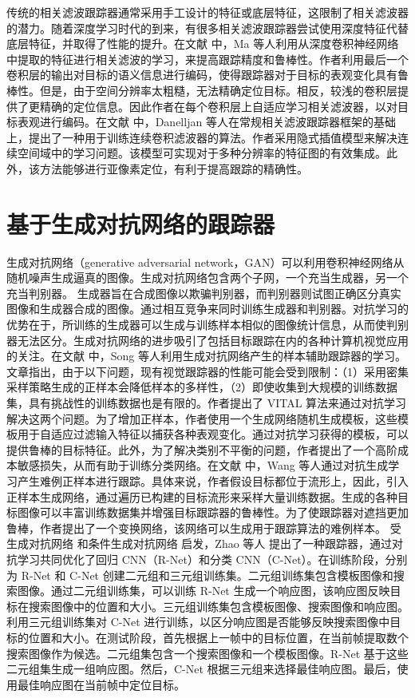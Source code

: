 传统的相关滤波跟踪器通常采用手工设计的特征或底层特征，这限制了相关滤波器的潜力。随着深度学习时代的到来，有很多相关滤波跟踪器尝试使用深度特征代替底层特征，并取得了性能的提升。在文献 \cite{CF2} 中，Ma 等人利用从深度卷积神经网络中提取的特征进行相关滤波的学习，来提高跟踪精度和鲁棒性。作者利用最后一个卷积层的输出对目标的语义信息进行编码，使得跟踪器对于目标的表观变化具有鲁棒性。但是，由于空间分辨率太粗糙，无法精确定位目标。相反，较浅的卷积层提供了更精确的定位信息。因此作者在每个卷积层上自适应学习相关滤波器，以对目标表观进行编码。在文献 \cite{danelljan2016beyond} 中，Danelljan 等人在常规相关滤波跟踪器框架的基础上，提出了一种用于训练连续卷积滤波器的算法。作者采用隐式插值模型来解决连续空间域中的学习问题。该模型可实现对于多种分辨率的特征图的有效集成。此外，该方法能够进行亚像素定位，有利于提高跟踪的精确性。
\section{基于生成对抗网络的跟踪器}
生成对抗网络（generative adversarial network，GAN）可以利用卷积神经网络从随机噪声生成逼真的图像。生成对抗网络包含两个子网，一个充当生成器，另一个充当判别器。 生成器旨在合成图像以欺骗判别器，而判别器则试图正确区分真实图像和生成器合成的图像。通过相互竞争来同时训练生成器和判别器。对抗学习的优势在于，所训练的生成器可以生成与训练样本相似的图像统计信息，从而使判别器无法区分。生成对抗网络的进步吸引了包括目标跟踪在内的各种计算机视觉应用的关注。在文献 \cite{VITAL} 中，Song 等人利用生成对抗网络产生的样本辅助跟踪器的学习。文章指出，由于以下问题，现有视觉跟踪器的性能可能会受到限制：（1）采用密集采样策略生成的正样本会降低样本的多样性，（2）即使收集到大规模的训练数据集，具有挑战性的训练数据也是有限的。作者提出了 VITAL 算法来通过对抗学习解决这两个问题。为了增加正样本，作者使用一个生成网络随机生成模板，这些模板用于自适应过滤输入特征以捕获各种表观变化。通过对抗学习获得的模板，可以提供鲁棒的目标特征。此外，为了解决类别不平衡的问题，作者提出了一个高阶成本敏感损失，从而有助于训练分类网络。在文献 \cite{SINT++} 中，Wang 等人通过对抗生成学习产生难例正样本进行跟踪。具体来说，作者假设目标都位于流形上，因此，引入正样本生成网络，通过遍历已构建的目标流形来采样大量训练数据。生成的各种目标图像可以丰富训练数据集并增强目标跟踪器的鲁棒性。为了使跟踪器对遮挡更加鲁棒，作者提出了一个变换网络，该网络可以生成用于跟踪算法的难例样本。%
受生成对抗网络 \cite{GAN} 和条件生成对抗网络 \cite{cGAN} 启发，Zhao 等人 \cite{AdversarialDeep} 提出了一种跟踪器，通过对抗学习共同优化了回归 CNN（R-Net）和分类 CNN（C-Net）。在训练阶段，分别为 R-Net 和 C-Net 创建二元组和三元组训练集。二元组训练集包含模板图像和搜索图像。通过二元组训练集，可以训练 R-Net 生成一个响应图，该响应图反映目标在搜索图像中的位置和大小。三元组训练集包含模板图像、搜索图像和响应图。利用三元组训练集对 C-Net 进行训练，以区分响应图是否能够反映搜索图像中目标的位置和大小。在测试阶段，首先根据上一帧中的目标位置，在当前帧提取数个搜索图像作为候选。二元组集包含一个搜索图像和一个模板图像。R-Net 基于这些二元组集生成一组响应图。然后，C-Net 根据三元组来选择最佳响应图。最后，使用最佳响应图在当前帧中定位目标。%

